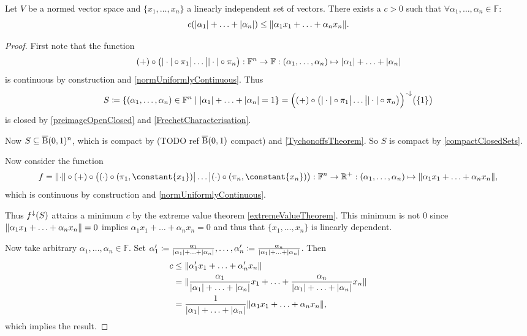 \begin{lemma} \label{coordinateContinuity}
Let $V$ be a normed vector space and $\{x_1, \ldots, x_n\}$ a linearly independent set of vectors. There exists a $c>0$ such that $\forall \alpha_1,\ldots, \alpha_n \in \mathbb{F}$:
\[ c(|\alpha_1|+\ldots+|\alpha_n|) \leq \lVert\alpha_1x_1 + \ldots + \alpha_nx_n\rVert. \]
\end{lemma}
\begin{proof}
First note that the function
\[ (+)\circ \big(|\cdot|\circ \pi_1 \big| \ldots \big| |\cdot|\circ \pi_n\big): \mathbb{F}^n \to \mathbb{F}: (\alpha_1,\ldots, \alpha_n)\mapsto |\alpha_1|+\ldots + |\alpha_n| \]
is continuous by construction and \ref{normUniformlyContinuous}. Thus
\[ S \defeq \setbuilder{(\alpha_1, \ldots, \alpha_n)\in \F^n}{|\alpha_1|+\ldots + |\alpha_n| = 1} = \Big((+)\circ \big(|\cdot|\circ \proj_1 \big| \ldots \big| |\cdot|\circ \proj_n\big)\Big)^{\preimf}\big(\{1\}\big) \]
is closed by \ref{preimageOpenClosed} and \ref{FrechetCharacterisation}.

Now $S \subseteq \operatorname{\overline{B}}(0,1)^n$, which is compact by (TODO ref $\operatorname{\overline{B}}(0,1)$ compact) and \ref{TychonoffsTheorem}. So $S$ is compact by \ref{compactClosedSets}.

Now consider the function
\[ f = \norm{\cdot}\circ (+) \circ \big((\cdot)\circ (\proj_1,\constant{x_1})\big|\ldots\big|(\cdot)\circ (\proj_n,\constant{x_n})\big): \F^n \to \R^+: (\alpha_1,\ldots, \alpha_n)\mapsto \norm{\alpha_1 x_1 + \ldots + \alpha_n x_n}, \]
which is continuous by construction and \ref{normUniformlyContinuous}.

Thus $f^{\downarrow}(S)$ attains a minimum $c$ by the extreme value theorem \ref{extremeValueTheorem}. This minimum is not $0$ since $\lVert\alpha_1 x_1 + \ldots + \alpha_n x_n\rVert = 0$ implies $\alpha_1 x_1 + \ldots + \alpha_n x_n = 0$ and thus that $\{x_1, \ldots, x_n\}$ is linearly dependent.

Now take arbitrary $\alpha_1,\ldots, \alpha_n \in \mathbb{F}$. Set $\alpha_1' \coloneqq \frac{\alpha_1}{|\alpha_1|+\ldots + |\alpha_n|}, \ldots, \alpha_n' \coloneqq \frac{\alpha_n}{|\alpha_1|+\ldots + |\alpha_n|}$. Then
\begin{align*}
c &\leq \lVert\alpha'_1 x_1 + \ldots + \alpha'_n x_n\rVert \\
&= \lVert\frac{\alpha_1}{|\alpha_1|+\ldots + |\alpha_n|} x_1 + \ldots + \frac{\alpha_n}{|\alpha_1|+\ldots + |\alpha_n|} x_n\rVert \\
&= \frac{1}{|\alpha_1|+\ldots + |\alpha_n|}\lVert\alpha_1 x_1 + \ldots + \alpha_n x_n\rVert,
\end{align*}
which implies the result.
\end{proof}

